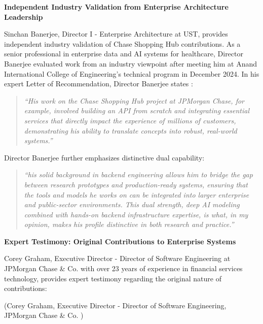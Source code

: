 \textbf{Independent Industry Validation from Enterprise Architecture Leadership}

Sinchan Banerjee, Director I - Enterprise Architecture at UST, provides independent industry validation of \drs Chase Shopping Hub contributions. As a senior professional in enterprise data and AI systems for healthcare, Director Banerjee evaluated \drs work from an industry viewpoint after meeting him at Anand International College of Engineering's technical program in December 2024. In his expert Letter of Recommendation, Director Banerjee states \cite{LOR4}:

\begin{quote}
\textit{``His work on the Chase Shopping Hub project at JPMorgan Chase, for example, involved building an API from scratch and integrating essential services that directly impact the experience of millions of customers, demonstrating his ability to translate concepts into robust, real-world systems.''}
\end{quote}

Director Banerjee further emphasizes \drs distinctive dual capability:

\begin{quote}
\textit{``his solid background in backend engineering allows him to bridge the gap between research prototypes and production-ready systems, ensuring that the tools and models he works on can be integrated into larger enterprise and public-sector environments. This dual strength, deep AI modeling combined with hands-on backend infrastructure expertise, is what, in my opinion, makes his profile distinctive in both research and practice.''}
\end{quote}

\textbf{Expert Testimony: Original Contributions to Enterprise Systems}

Corey Graham, Executive Director - Director of Software Engineering at JPMorgan Chase \& Co. with over 23 years of experience in financial services technology, provides expert testimony regarding the original nature of \drs contributions:

 (Corey Graham, Executive Director - Director of Software Engineering, JPMorgan Chase \& Co. \cite{CR2})

